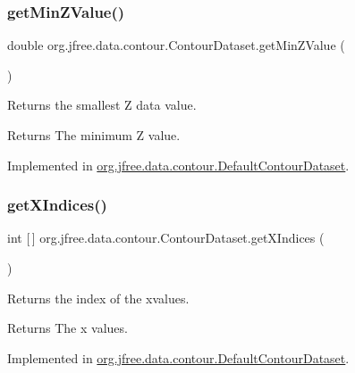 \subsubsection{\texorpdfstring{get\+Min\+Z\+Value()}{getMinZValue()}}
{\footnotesize\ttfamily double org.\+jfree.\+data.\+contour.\+Contour\+Dataset.\+get\+Min\+Z\+Value (\begin{DoxyParamCaption}{ }\end{DoxyParamCaption})}

Returns the smallest Z data value.

\begin{DoxyReturn}{Returns}
The minimum Z value. 
\end{DoxyReturn}


Implemented in \mbox{\hyperlink{classorg_1_1jfree_1_1data_1_1contour_1_1_default_contour_dataset_aab57c6d1cdd13d5574e3fd0170fce307}{org.\+jfree.\+data.\+contour.\+Default\+Contour\+Dataset}}.

\mbox{\label{interfaceorg_1_1jfree_1_1data_1_1contour_1_1_contour_dataset_a7f341ba05202db3970ec479b1ef1a999}} 
\subsubsection{\texorpdfstring{get\+X\+Indices()}{getXIndices()}}
{\footnotesize\ttfamily int \mbox{[}$\,$\mbox{]} org.\+jfree.\+data.\+contour.\+Contour\+Dataset.\+get\+X\+Indices (\begin{DoxyParamCaption}{ }\end{DoxyParamCaption})}

Returns the index of the xvalues.

\begin{DoxyReturn}{Returns}
The x values. 
\end{DoxyReturn}


Implemented in \mbox{\hyperlink{classorg_1_1jfree_1_1data_1_1contour_1_1_default_contour_dataset_a69fe875df187cabb1860f0ed79934d85}{org.\+jfree.\+data.\+contour.\+Default\+Contour\+Dataset}}.

\mbox{\label{interfaceorg_1_1jfree_1_1data_1_1contour_1_1_contour_dataset_ad7a2140d12c0543a8178c8aafc4b3475}} 

